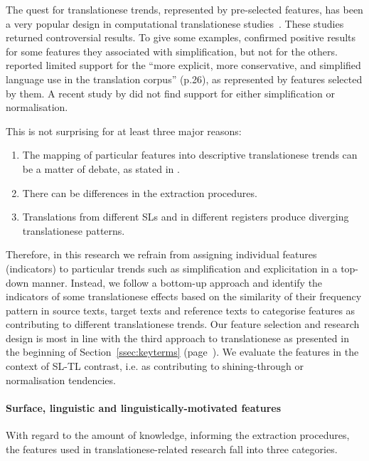 The quest for translationese trends, represented by pre-selected features, has been a very popular design in computational translationese studies~\cite[and most recently~\cite{Hu2021}]{Corpas2008,Ilisei2010,Volansky2015}.
These studies returned controversial results. To give some examples, \citet{Corpas2008} confirmed positive results for some features they associated with simplification, but not for the others. \citet{Kruger2010} reported limited support for the ``more explicit, more conservative, and simplified language use in the translation corpus'' (p.26), as represented by features selected by them. A recent study by \citet{Hu2021} did not find support for either simplification or normalisation.

This is not surprising for at least three major reasons: 
\begin{enumerate} \compresslist{}
	\item The mapping of particular features into descriptive translationese trends can be a matter of debate, as stated in \citet[p.25]{Zanettin2013}.
	\item There can be differences in the extraction procedures.
	\item Translations from different SLs and in different registers produce diverging translationese patterns.
\end{enumerate}

Therefore, in this research we refrain from assigning individual features (indicators) to particular trends such
as simplification and explicitation in a top-down manner. Instead, we follow a bottom-up approach and identify
the indicators of some translationese effects based on the similarity of their frequency pattern in
source texts, target texts and reference texts to categorise features as contributing to different translationese trends.
Our feature selection and research design is most in line with the third approach to translationese as presented in the beginning of Section~\ref{ssec:keyterms} (page~\pageref{ssec:keyterms}). 
We evaluate the features in the context of SL-TL contrast, i.e. as contributing to shining-through or normalisation tendencies.
\label{pg:coling_end}

\paragraph{Surface, linguistic and linguistically-motivated features} With regard to the amount of knowledge, informing the extraction procedures, the features used in translationese-related research fall into three categories. 

